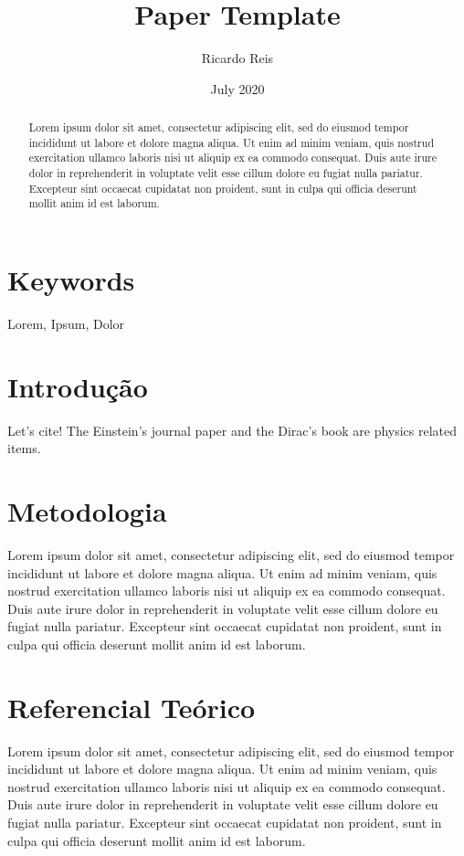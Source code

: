 \documentclass[12pt, a4paper,twocolumn]{article}
\title{Paper Template}
\author{Ricardo Reis }
\date{July 2020}
\begin{document}
\maketitle

\begin{abstract}
Lorem ipsum dolor sit amet, consectetur adipiscing elit, sed do eiusmod tempor incididunt ut labore et dolore magna aliqua. Ut enim ad minim veniam, quis nostrud exercitation ullamco laboris nisi ut aliquip ex ea commodo consequat. Duis aute irure dolor in reprehenderit in voluptate velit esse cillum dolore eu fugiat nulla pariatur. Excepteur sint occaecat cupidatat non proident, sunt in culpa qui officia deserunt mollit anim id est laborum.
\end{abstract}

\section*{Keywords}
Lorem, Ipsum, Dolor

\section{Introdução}
Let's cite! The Einstein's journal paper \cite{einstein} and the Dirac's 
book \cite{dirac} are physics related items. 

\section{Metodologia}
Lorem ipsum dolor sit amet, consectetur adipiscing elit, sed do eiusmod tempor incididunt ut labore et dolore magna aliqua. Ut enim ad minim veniam, quis nostrud exercitation ullamco laboris nisi ut aliquip ex ea commodo consequat. Duis aute irure dolor in reprehenderit in voluptate velit esse cillum dolore eu fugiat nulla pariatur. Excepteur sint occaecat cupidatat non proident, sunt in culpa qui officia deserunt mollit anim id est laborum.

\section{Referencial Teórico}
Lorem ipsum dolor sit amet, consectetur adipiscing elit, sed do eiusmod tempor incididunt ut labore et dolore magna aliqua. Ut enim ad minim veniam, quis nostrud exercitation ullamco laboris nisi ut aliquip ex ea commodo consequat. Duis aute irure dolor in reprehenderit in voluptate velit esse cillum dolore eu fugiat nulla pariatur. Excepteur sint occaecat cupidatat non proident, sunt in culpa qui officia deserunt mollit anim id est laborum.
\end{document}
